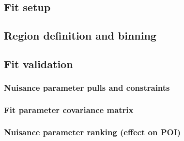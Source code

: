 
\subsection{Fit setup}
\label{sec:fit_setup}

\subsection{Region definition and binning}
\label{sec:region_definition_and_binning}

\subsection{Fit validation}
\label{sec:fit_validation}

\subsubsection{Nuisance parameter pulls and constraints}
\label{sec:nuisance_parameter_pulls_and_constraints}

\subsubsection{Fit parameter covariance matrix}
\label{sec:fit_parameter_covariance_matrix}

\subsubsection{Nuisance parameter ranking (effect on POI)}
\label{sec:nuisance_parameter_ranking}
